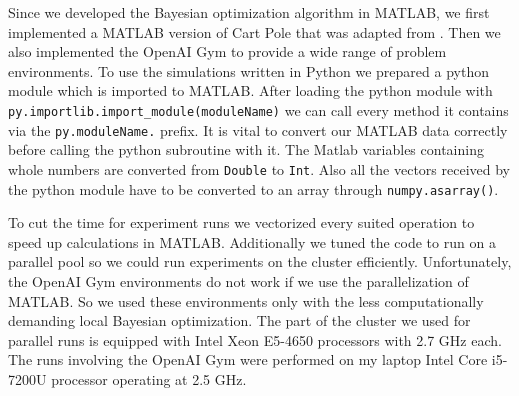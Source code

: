 Since we developed the Bayesian optimization algorithm in MATLAB, we first implemented a MATLAB version of Cart Pole that was adapted from \cite{joseCode}. Then we also implemented the OpenAI Gym \cite{DBLP:journals/corr/BrockmanCPSSTZ16} to provide a wide range of problem environments. To use the simulations written in Python we prepared a python module which is imported to MATLAB. After loading the python module with \verb|py.importlib.import_module(moduleName)| we can call every method it contains via the \verb|py.moduleName.| prefix. It is vital to convert our MATLAB data correctly before calling the python subroutine with it. The Matlab variables containing whole numbers are converted from \verb|Double| to \verb|Int|. Also all the vectors received by the python module have to be converted to an array through \verb|numpy.asarray()|.

To cut the time for experiment runs we vectorized every suited operation to speed up calculations in MATLAB. Additionally we tuned the code to run on a parallel pool so we could run experiments on the cluster efficiently. Unfortunately, the OpenAI Gym environments do not work if we use the parallelization of MATLAB. So we used these environments only with the less computationally demanding local Bayesian optimization. The part of the cluster we used for parallel runs is equipped with Intel Xeon E5-4650 processors with 2.7 GHz each. The runs involving the OpenAI Gym were performed on my laptop Intel Core i5-7200U processor operating at 2.5 GHz.\\

%

